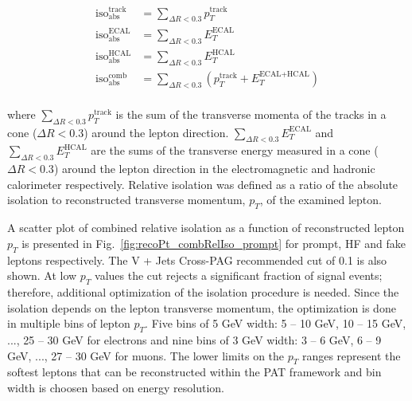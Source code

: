 \documentclass{cmspaper}
\begin{document}
\begin{align*}
   \textrm{iso}_{\textrm{abs}}^{\textrm{track}} & = \sum_{\Delta R < 0.3} p_T^{\textrm{track}} \\
   \textrm{iso}_{\textrm{abs}}^{\textrm{ECAL}}  & = \sum_{\Delta R < 0.3} E_T^{\textrm{ECAL}}  \\
   \textrm{iso}_{\textrm{abs}}^{\textrm{HCAL}}  & = \sum_{\Delta R < 0.3} E_T^{\textrm{HCAL}}  \\
   \textrm{iso}_{\textrm{abs}}^{\textrm{comb}}  & = \sum_{\Delta R < 0.3}\left(p_T^{\textrm{track}} + E_T^{\textrm{ECAL} + \textrm{HCAL}}\right) \\
\end{align*}

where $\sum_{\Delta R < 0.3} p_T^{\textrm{track}}$ is the sum of the transverse momenta of the
tracks in a cone ($\Delta R < 0.3$) around the lepton direction.
$\sum_{\Delta R < 0.3} E_T^{\textrm{ECAL}}$ and $\sum_{\Delta R < 0.3} E_T^{\textrm{HCAL}}$ are the
sums of the transverse energy measured in a cone ($\Delta R < 0.3$) around the lepton direction in the
electromagnetic and hadronic calorimeter respectively. Relative isolation was defined as a ratio of the
absolute isolation to reconstructed transverse momentum, $p_T$, of the examined lepton.

A scatter plot of combined relative isolation as a function of reconstructed lepton $p_T$ is presented in
Fig.~\ref{fig:recoPt_combRelIso_prompt} for prompt, HF and fake leptons respectively. The V +
Jets Cross-PAG recommended cut of 0.1 is also shown. At low $p_T$ values the cut rejects a significant
fraction of signal events; therefore, additional optimization of the isolation procedure is
needed. Since the isolation depends on the lepton transverse momentum, the
optimization is done in multiple bins of lepton $p_T$.
Five bins of 5 GeV width: 5 -- 10 GeV, 10 -- 15 GeV, ..., 25 -- 30 GeV for electrons
and nine bins of 3 GeV width: 3 -- 6 GeV, 6 -- 9 GeV, ..., 27 -- 30 GeV for muons.
The lower limits on the $p_T$ ranges represent the softest leptons that can be reconstructed within
the PAT framework and bin width is choosen based on energy resolution.
\end{document}
